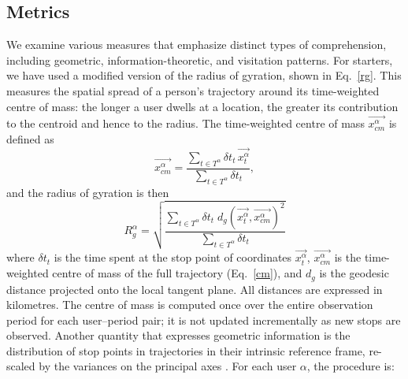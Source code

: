 \documentclass[main.tex]{subfiles}
\begin{document}
\subsection*{Metrics}

We examine various measures that emphasize distinct types of comprehension, including geometric, information-theoretic, and visitation patterns. For starters, we have used a modified version of the radius of gyration, shown in Eq.~\ref{rg}. This measures the spatial spread of a person's trajectory around its time-weighted centre of mass: the longer a user dwells at a location, the greater its contribution to the centroid and hence to the radius. The time-weighted centre of mass $\Vec{x^{\alpha}_{cm}}$ is defined as
%
\begin{equation}
    \Vec{x^{\alpha}_{cm}} = \frac{\sum_{t \in T^{\alpha}} \delta t_{t}\, \Vec{x^{\alpha}_{t}}}{\sum_{t \in T^{\alpha}} \delta t_{t}},
    \label{cm}
\end{equation}
%
and the radius of gyration is then
%
\begin{equation}
     R^{\alpha}_{g} = \sqrt{\frac{\displaystyle\sum_{t \in T^{\alpha}} \delta t_{t}\; d_{g}(\Vec{x^{\alpha}_{t}},\Vec{x^{\alpha}_{cm}})^2}{\displaystyle\sum_{t \in T^{\alpha}} \delta t_{t}}}
     \label{rg}
\end{equation}
%
where $\delta t_{t}$ is the time spent at the stop point of coordinates $\Vec{x^{\alpha}_{t}}$, $\Vec{x^{\alpha}_{cm}}$ is the time-weighted centre of mass of the full trajectory (Eq.~\ref{cm}), and $d_{g}$ is the geodesic distance projected onto the local tangent plane. All distances are expressed in kilometres. The centre of mass is computed once over the entire observation period for each user--period pair; it is not updated incrementally as new stops are observed. Another quantity that expresses geometric information is the distribution of stop points in trajectories in their intrinsic reference frame, re-scaled by the variances on the principal axes \cite{radius_gyration}. For each user $\alpha$, the procedure is:
%
\end{document}
